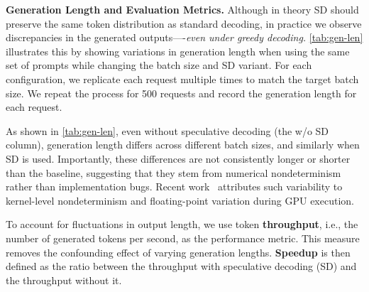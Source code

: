 \documentclass{article}
\begin{document}
\textbf{Generation Length and Evaluation Metrics.}
Although in theory SD should preserve the same token distribution as standard decoding, in practice we observe discrepancies in the generated outputs—-{\em even under greedy decoding.} \autoref{tab:gen-len} illustrates this by showing variations in generation length when using the same set of prompts while changing the batch size and SD variant.
For each configuration, we replicate each request multiple times to match the target batch size.
We repeat the process for 500 requests and record the generation length for each request.
\begin{table}[h]
\centering
\caption{Average generation length (mean $\pm$ standard deviation) of the baseline (w/o SD) and different SD variants on the ShareGPT dataset using Llama3.1-8B across varying batch sizes.}
\label{tab:gen-len}
\end{table}

As shown in \autoref{tab:gen-len}, even without speculative decoding (the w/o SD column), generation length differs across different batch sizes, and similarly when SD is used. Importantly, these differences are not consistently longer or shorter than the baseline, suggesting that they stem from numerical nondeterminism rather than implementation bugs.
Recent work~\cite{he2025nondeterminism} attributes such variability to kernel-level nondeterminism and floating-point variation during GPU execution.

To account for fluctuations in output length, we use token \textbf{throughput}, i.e., the number of generated tokens per second, as the performance metric.
This measure removes the confounding effect of varying generation lengths. \textbf{Speedup} is then defined as the ratio between the throughput with speculative decoding (SD) and the throughput without it.
\end{document}
